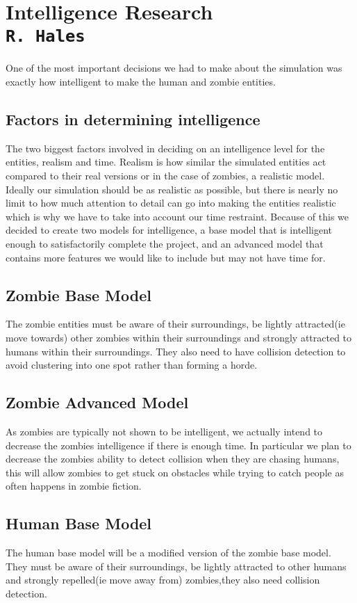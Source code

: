 \pagestyle{empty}
\section{Intelligence Research\\{\small\tt{R.~Hales}}}
One of the most important decisions we had to make about the simulation was exactly how intelligent to make the human and zombie entities.
\subsection{Factors in determining intelligence}
The two biggest factors involved in deciding on an intelligence level for the entities, realism and time. Realism is how similar the simulated entities act compared to their real versions or in the case of zombies, a realistic model. Ideally our simulation should be as realistic as possible, but there is nearly no limit to how much attention to detail can go into making the entities realistic which is why we have to take into account our time restraint. Because of this we decided to create two models for intelligence, a base model that is intelligent enough to satisfactorily complete the project, and an advanced model that contains more features we would like to include but may not have time for.

\subsection{Zombie Base Model}
The zombie entities must be aware of their surroundings, be lightly attracted(ie move towards) other zombies within their surroundings and strongly attracted to humans within their surroundings. They also need to have collision detection to avoid clustering into one spot rather than forming a horde.

\subsection{Zombie Advanced Model}
As zombies are typically not shown to be intelligent, we actually intend to decrease the zombies intelligence if there is enough time. In particular we plan to decrease the zombies ability to detect collision when they are chasing humans, this will allow zombies to get stuck on obstacles while trying to catch people as often happens in zombie fiction.

\subsection{Human Base Model}
The human base model will be a modified version of the zombie base model. They must be aware of their surroundings, be lightly attracted to other humans and strongly repelled(ie move away from) zombies,they also need collision detection.

